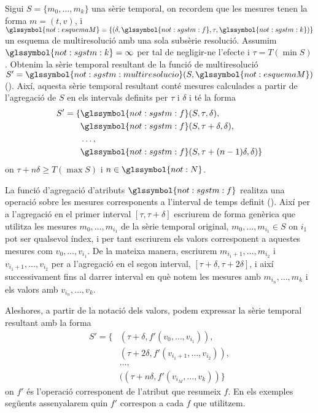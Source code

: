 \begin{definition}
  \label{def:informacio:notaciovalors}
  Sigui $S=\{m_0,\dotsc,m_k\}$ una sèrie temporal, on recordem que les
  mesures tenen la forma $m=(t,v)$, i $\glssymbol{not:esquemaM}= \{
  (\delta, \glssymbol{not:sgstm:f} , \tau, \glssymbol{not:sgstm:k})
  \}$ un esquema de multiresolució amb una sola subsèrie
  resolució. Assumim $ \glssymbol{not:sgstm:k}=\infty$ per tal de
  negligir-ne l'efecte i $\tau=T(\min S)$. Obtenim la sèrie temporal
  resultant de la funció de multiresolució
  $S'=\glssymbol{not:sgstm:multiresolucio}(S,\glssymbol{not:esquemaM})$
  ().  Així, aquesta sèrie temporal
  resultant conté mesures calculades a partir de l'agregació de $S$ en
  els intervals definits per $\tau$ i $\delta$ i té la forma
  \begin{align*}
    S'=  \{ & \glssymbol{not:sgstm:f}(S,\tau,\delta), \\
    & \glssymbol{not:sgstm:f}(S,\tau+\delta,\delta),\\
    &\dotsc, \\
    & \glssymbol{not:sgstm:f}(S,\tau+(n-1)\delta,\delta)\}
  \end{align*}
  on $\tau+n\delta\geq T(\max S)$ i $n\in\glssymbol{not:N}$.


  La funció d'agregació d'atributs $\glssymbol{not:sgstm:f}$ realitza
  una operació sobre les mesures corresponents a l'interval de temps
  definit ().  Així per a l'agregació en
  el primer interval $[\tau,\tau+\delta]$ escriurem de forma genèrica
  que utilitza les mesures $m_0,\dotsc,m_{i_1}$ de la sèrie temporal
  original, $m_0,\dotsc,m_{i_1} \in S$ on $i_1$ pot ser qualsevol
  índex, i per tant escriurem els valors corresponent a aquestes
  mesures com $v_0,\dotsc,v_{i_1}$. De la mateixa manera, escriurem
  $m_{i_1+1},\dotsc,m_{i_2}$ i $v_{i_1+1},\dotsc,v_{i_2}$ per a
  l'agregació en el segon interval,
  $[\tau+\delta,\tau+2\delta]$, i així successivament
  fins al darrer interval en què notem les mesures amb $m_{i_n},
  \dotsc, m_k$ i els valors amb $v_{i_n}, \dotsc, v_k$.

  Aleshores, a partir de la notació dels valors, podem expressar la
  sèrie temporal resultant amb la forma
  \begin{align*}
    S'=\{& (\tau+\delta, f'(v_0,\dotsc,v_{i_1})),\\
    & (\tau+2\delta, f'(v_{i_1+1},\dotsc,v_{i_2})),\\
    & \dotsc,\\
    & ((\tau+n\delta ,f'(v_{i_M},\dotsc, v_k)) \}
  \end{align*}
  on $f'$ és l'operació corresponent de l'atribut que resumeix
  $f$. En els exemples següents assenyalarem quin $f'$ correspon a
  cada $f$ que utilitzem.
\end{definition}
